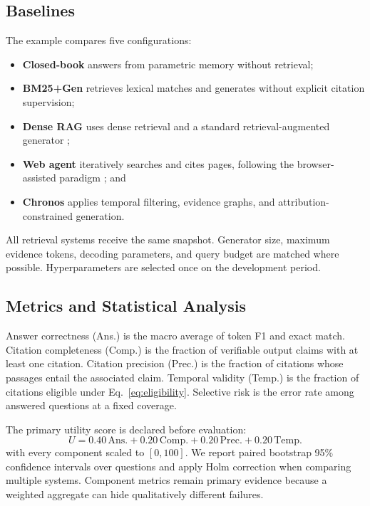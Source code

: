 \subsection{Baselines}

The example compares five configurations:

\begin{itemize}
  \item \textbf{Closed-book} answers from parametric memory without retrieval;
  \item \textbf{BM25+Gen} retrieves lexical matches and generates without
    explicit citation supervision;
  \item \textbf{Dense RAG} uses dense retrieval and a standard
    retrieval-augmented generator \cite{lewis2020rag};
  \item \textbf{Web agent} iteratively searches and cites pages, following the
    browser-assisted paradigm \cite{nakano2021webgpt}; and
  \item \textbf{Chronos} applies temporal filtering, evidence graphs, and
    attribution-constrained generation.
\end{itemize}

All retrieval systems receive the same snapshot.  Generator size, maximum
evidence tokens, decoding parameters, and query budget are matched where
possible.  Hyperparameters are selected once on the development period.

\subsection{Metrics and Statistical Analysis}

Answer correctness (Ans.) is the macro average of token F1 and exact match.
Citation completeness (Comp.) is the fraction of verifiable output claims with
at least one citation.  Citation precision (Prec.) is the fraction of citations
whose passages entail the associated claim.  Temporal validity (Temp.) is the
fraction of citations eligible under Eq.~\eqref{eq:eligibility}.  Selective risk
is the error rate among answered questions at a fixed coverage.

The primary utility score is declared before evaluation:
\begin{equation}
 U = 0.40\,\mathrm{Ans.}+0.20\,\mathrm{Comp.}
   +0.20\,\mathrm{Prec.}+0.20\,\mathrm{Temp.}
 \label{eq:utility}
\end{equation}
with every component scaled to $[0,100]$.  We report paired bootstrap 95\%
confidence intervals over questions and apply Holm correction when comparing
multiple systems.  Component metrics remain primary evidence because a weighted
aggregate can hide qualitatively different failures.
